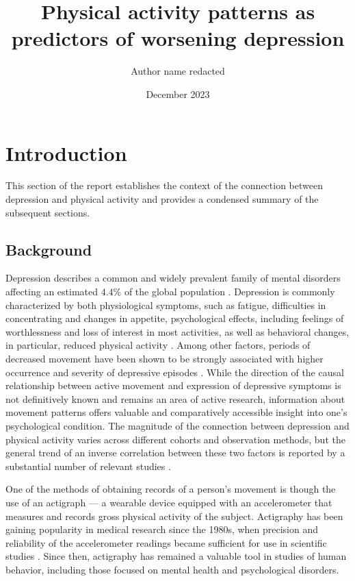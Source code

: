 \documentclass[12pt]{article}
\title{Physical activity patterns as predictors of worsening depression}
\author{Author name redacted}
\date{December 2023}
\begin{document}
\maketitle

\tableofcontents

\newpage

\section{Introduction}

This section of the report establishes the context of the connection between depression and physical activity and provides a condensed summary of the subsequent sections.

\subsection{Background}

Depression describes a common and widely prevalent family of mental disorders affecting an estimated $4.4\%$ of the global population \parencite{who}. Depression is commonly characterized by both physiological symptoms, such as fatigue, difficulties in concentrating and changes in appetite, psychological effects, including feelings of worthlessness and loss of interest in most activities, as well as behavioral changes, in particular, reduced physical activity \parencite{DSM5}. 
Among other factors, periods of decreased movement have been shown to be strongly associated with higher occurrence and severity of depressive episodes \parencite{O_Brien, Pinto, Harris}. While the direction of the causal relationship between active movement and expression of depressive symptoms is not definitively known and remains an area of active research, information about movement patterns offers valuable and comparatively accessible insight into one's psychological condition. The magnitude of the connection between depression and physical activity varies across different cohorts and observation methods, but the general trend of an inverse correlation between these two factors is reported by a substantial number of relevant studies \parencite{Parker_Brotchie_1992}. 

One of the methods of obtaining records of a person's movement is though the use of an actigraph — a wearable device equipped with an accelerometer that measures and records gross physical activity of the subject. Actigraphy has been gaining popularity in medical research since the 1980s, when precision and reliability of the accelerometer readings became sufficient for use in scientific studies \parencite{Berger_2008}. Since then, actigraphy has remained a valuable tool in studies of human behavior, including those focused on mental health and psychological disorders.
\end{document}
